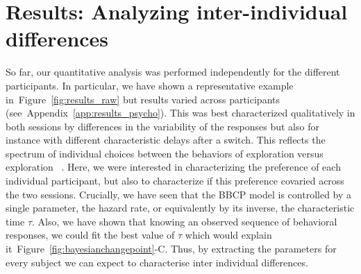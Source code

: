 \documentclass[12pt,english]{article}%
\newcommand{\citep}[1]{\parencite{#1}}
\newcommand{\seeFig}[1]{Figure~\ref{fig:#1}}
\newcommand{\seeApp}[1]{Appendix~\ref{app:#1}}
\begin{document}
\section{Results: Analyzing inter-individual differences}
\label{sec:inter}
So far, our quantitative analysis was performed independently
for the different participants.
In particular, we have shown a representative example in~\seeFig{results_raw}
but results varied across participants (see~\seeApp{results_psycho}).
This was best characterized qualitatively in both sessions by differences
in the variability of the responses but also for instance
with different characteristic delays after a switch.
This reflects the spectrum of individual choices
between the behaviors of exploration versus exploration ~\citep{Behrens07}.
Here, we were interested in characterizing the preference
of each individual participant, but also to characterize
if this preference covaried across the two sessions.
Crucially, we have seen that the BBCP model is controlled by a single parameter,
the hazard rate, or equivalently by its inverse, the characteristic time $\tau$.
Also, we have shown that knowing an observed sequence of behavioral responses,
we could fit the best value of $\tau$ which would explain it~\seeFig{bayesianchangepoint}-C.
Thus, by extracting the parameters for every subject
we can expect to characterise inter individual differences.
\end{document}
